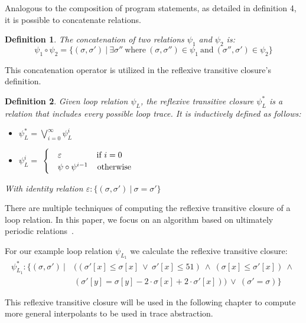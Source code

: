\documentclass{article}
\newcounter{example}[section]
\newtheorem{mydef}{Definition}
\newcommand\mycom[1]{}
\newcommand\mycom[1]{#1}
\newcommand{\dd}[1]{\mycom{\todo[color=orange!40,inline]{\small DD: #1}}}
\newcommand{\ts}[1]{\mycom{\todo[color=green!40,inline]{\small TS: #1}}}
\begin{document}
Analogous to the composition of program statements, as detailed in definition 4, it is possible to concatenate relations.
\ts{Use labels to refer to definitions, sections,...}
\dd{And if you are at it: it also helps to have names for the definitions}
\begin{mydef}
    The concatenation of two relations $\psi_1$ and $\psi_2$ is:
    \begin{equation*}
        \psi_1 \circ \psi_2 = \{(\sigma, \sigma')\ |\ \exists \sigma''\ \text{where}\ (\sigma, \sigma'') \in \psi_1\ \text{and}\ (\sigma'', \sigma') \in \psi_2 \}
    \end{equation*}
\end{mydef}

This concatenation operator is utilized in the reflexive transitive closure's definition.

\begin{mydef}
    Given loop relation $\psi_L$, the reflexive transitive closure $\psi_L^*$ is a relation that includes every possible loop trace. It is inductively defined as follows:
    \begin{itemize}
        \item $\psi^*_L = \bigvee_{i=0}^\infty \psi^i_L$
        \item $\psi^i_L = $
        $\begin{cases}
            & \varepsilon \hspace{1.5cm} \text{if}\ i = 0 \\
            & \psi \circ \psi^{i - 1} \hspace{0.4cm}\text{otherwise}
        \end{cases}$
    \end{itemize}
With identity relation $\varepsilon: \{(\sigma, \sigma')\ |\ \sigma = \sigma'\}$
\end{mydef}
\ts{In the definition, only define reflexive transitive closure, and \emph{afterwards} write what it means here (...every possible loop trace...).}
\dd{You missed some $L$s}
There are multiple techniques of computing the reflexive transitive closure of a loop relation. 
In this paper, we focus on an algorithm based on ultimately periodic relations~\cite{JillThesis}.

For our example loop relation $\psi_{L_1}$ we calculate the reflexive transitive closure:
\begin{align*}
    \psi^*_{L_1}: \{(\sigma, \sigma') \  |\ &((\sigma'[x] \leq \sigma[x]\ \lor\ \sigma'[x] \leq 51)\ \land\ (\sigma[x] \leq \sigma'[x])\ \land\ \\ & (\sigma'[y] = \sigma[y] - 2 \cdot \sigma[x] + 2\cdot \sigma'[x]))\ \lor\ (\sigma' = \sigma) \}
\end{align*}
\newcommand{\rtc}[1]{\ensuremath{\psi^*_{#1}}}
\dd{Are you really sure this is the correct $\rtc{L_1}$?}
This reflexive transitive closure will be used in the following chapter to compute more general interpolants to be used in trace abstraction.
\end{document}
